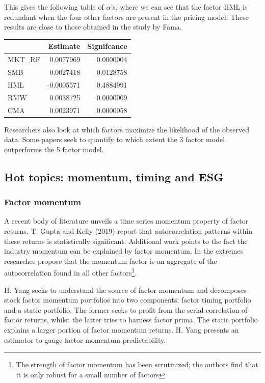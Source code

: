 This gives the following table of $\alpha$'s, where we can see that the factor HML is redundant when the four other factors are present in the pricing model. These results are close to those obtained in the study by Fama.
\begin{table}[H]
    \centering
    \begin{tabular}{lrr}
    \toprule
      & Estimate & Signifcance\\
    \midrule
    MKT\_RF & 0.0077969 & 0.0000004\\
    SMB & 0.0027418 & 0.0128758\\
    HML & -0.0005571 & 0.4884991\\
    RMW & 0.0038725 & 0.0000009\\
    CMA & 0.0023971 & 0.0000058\\
    \bottomrule
    \end{tabular}
\end{table}

Researchers also look at which factors maximize the likelihood of the observed data. Some papers seek to quantify to which extent the 3 factor model outperforms the 5 factor model.

\subsection{Hot topics: momentum, timing and ESG}

\subsubsection{Factor momentum}
A recent body of literature unveils a time series momentum property of factor returns. T. Gupta and Kelly (2019) report that autocorrelation patterns within these returns is statistically significant. Additional work points to the fact the industry momentum can be explained by factor momentum. In the extremes researches propose that the momentum factor is an aggregate of the autocorrelation found in all other factors\footnote{The strength of factor momentum has been scrutinized; the authors find that it is only robust for a small number of factors}.

H. Yang seeks to understand the source of factor momentum and decomposes stock factor momentum portfolios into two components: factor timing portfolio and a static portfolio. The former seeks to profit from the serial correlation of factor returns, whilst the latter tries to harness factor prima. The static portfolio explains a larger portion of factor momentum returns. H. Yang presents an estimator to gauge factor momentum predictability.

